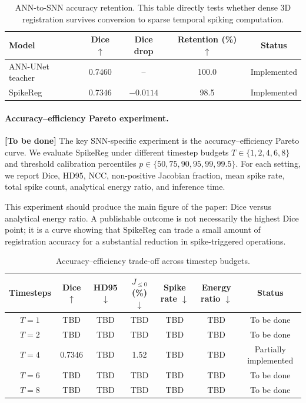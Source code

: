 \begin{table}[t]
\centering
\caption{ANN-to-SNN accuracy retention. This table directly tests whether dense 3D registration survives conversion to sparse temporal spiking computation.}
\label{tab:retention}
\begin{tabular}{lcccc}
\toprule
Model & Dice $\uparrow$ & Dice drop & Retention (\%) $\uparrow$ & Status \\
\midrule
ANN-UNet teacher & 0.7460 & -- & 100.0 & Implemented \\
SpikeReg & 0.7346 & $-0.0114$ & 98.5 & Implemented \\
\bottomrule
\end{tabular}
\end{table}

\paragraph{Accuracy--efficiency Pareto experiment.}
\textbf{[To be done]} The key SNN-specific experiment is the accuracy--efficiency Pareto curve. We evaluate SpikeReg under different timestep budgets \(T \in \{1,2,4,6,8\}\) and threshold calibration percentiles \(p \in \{50,75,90,95,99,99.5\}\). For each setting, we report Dice, HD95, NCC, non-positive Jacobian fraction, mean spike rate, total spike count, analytical energy ratio, and inference time.

This experiment should produce the main figure of the paper: Dice versus analytical energy ratio. A publishable outcome is not necessarily the highest Dice point; it is a curve showing that SpikeReg can trade a small amount of registration accuracy for a substantial reduction in spike-triggered operations.

\begin{table}[t]
\centering
\caption{Accuracy--efficiency trade-off across timestep budgets.}
\label{tab:timestep_ablation}
\begin{tabular}{ccccccc}
\toprule
Timesteps & Dice $\uparrow$ & HD95 $\downarrow$ & $J_{\leq0}$ (\%) $\downarrow$ & Spike rate $\downarrow$ & Energy ratio $\downarrow$ & Status \\
\midrule
$T=1$ & TBD & TBD & TBD & TBD & TBD & To be done \\
$T=2$ & TBD & TBD & TBD & TBD & TBD & To be done \\
$T=4$ & 0.7346 & TBD & 1.52 & TBD & TBD & Partially implemented \\
$T=6$ & TBD & TBD & TBD & TBD & TBD & To be done \\
$T=8$ & TBD & TBD & TBD & TBD & TBD & To be done \\
\bottomrule
\end{tabular}
\end{table}

